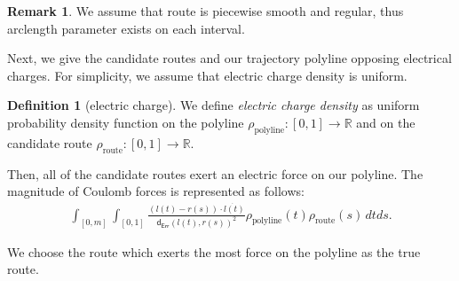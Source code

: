 \documentclass{article}
\numberwithin{equation}{section}
\theoremstyle{definition}
\newtheorem{definition}{Definition}[section]
\newtheorem{remark}[remark]{Remark}
\newcommand{\derr}{\mathsf{d}_{\mathsf{Err}}}
\newcommand{\R}{\mathbb{R}}
\begin{document}
\begin{remark}
We assume that route is piecewise smooth and regular, thus arclength parameter exists on each interval.  
\end{remark}

Next, we give the candidate routes and our trajectory polyline opposing electrical charges. For simplicity, we assume that electric charge density is uniform.

\begin{definition}[electric charge]
    We define \emph{electric charge density} as uniform probability density function on the polyline $\rho_{\mathrm{polyline}}:[0,1]\to\R$ and on the candidate route $\rho_{\mathrm{route}}:[0,1]\to\R$.
\end{definition}

Then, all of the candidate routes exert an electric force on our polyline. 
The magnitude of Coulomb forces is represented as follows: 
\begin{align}
    \int_{[0,m]}\int_{[0,1]}\frac{(l(t)-r(s))\cdot\Dot{l(t)}}{\derr (l(t),r(s))^{2}}\rho_{\mathrm{polyline}}(t)\rho_{\mathrm{route}}(s)\,dtds.
\end{align}

We choose the route which exerts the most force on the polyline as the true route.
\end{document}
